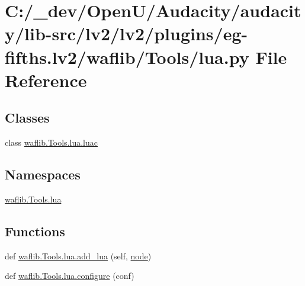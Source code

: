 \hypertarget{lv2_2plugins_2eg-fifths_8lv2_2waflib_2_tools_2lua_8py}{}\section{C\+:/\+\_\+dev/\+Open\+U/\+Audacity/audacity/lib-\/src/lv2/lv2/plugins/eg-\/fifths.lv2/waflib/\+Tools/lua.py File Reference}
\label{lv2_2plugins_2eg-fifths_8lv2_2waflib_2_tools_2lua_8py}
\subsection*{Classes}
\begin{DoxyCompactItemize}
\item 
class \hyperlink{classwaflib_1_1_tools_1_1lua_1_1luac}{waflib.\+Tools.\+lua.\+luac}
\end{DoxyCompactItemize}
\subsection*{Namespaces}
\begin{DoxyCompactItemize}
\item 
 \hyperlink{namespacewaflib_1_1_tools_1_1lua}{waflib.\+Tools.\+lua}
\end{DoxyCompactItemize}
\subsection*{Functions}
\begin{DoxyCompactItemize}
\item 
def \hyperlink{namespacewaflib_1_1_tools_1_1lua_a68e603a9eb9ca00ea36ac02d5fd4e360}{waflib.\+Tools.\+lua.\+add\+\_\+lua} (self, \hyperlink{structnode}{node})
\item 
def \hyperlink{namespacewaflib_1_1_tools_1_1lua_a5419673a215f8866f529e47be9f846e5}{waflib.\+Tools.\+lua.\+configure} (conf)
\end{DoxyCompactItemize}
